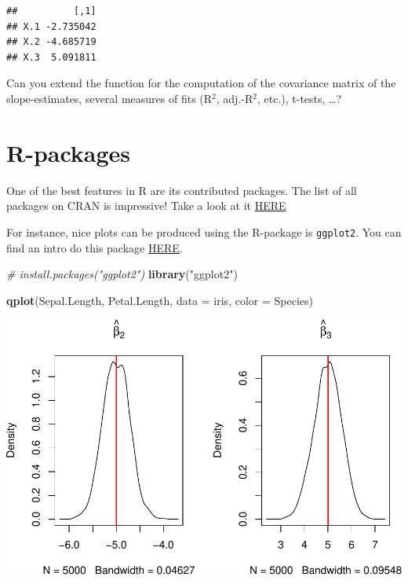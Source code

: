 \documentclass[]{book}
\newenvironment{Shaded}{\begin{snugshade}}{\end{snugshade}}
\newcommand{\CommentTok}[1]{\textcolor[rgb]{0.56,0.35,0.01}{\textit{#1}}}
\newcommand{\DataTypeTok}[1]{\textcolor[rgb]{0.13,0.29,0.53}{#1}}
\newcommand{\KeywordTok}[1]{\textcolor[rgb]{0.13,0.29,0.53}{\textbf{#1}}}
\newcommand{\NormalTok}[1]{#1}
\newcommand{\StringTok}[1]{\textcolor[rgb]{0.31,0.60,0.02}{#1}}
\theoremstyle{definition}
\theoremstyle{definition}
\theoremstyle{definition}
\theoremstyle{remark}
\begin{document}
\begin{verbatim}
##          [,1]
## X.1 -2.735042
## X.2 -4.685719
## X.3  5.091811
\end{verbatim}

Can you extend the function for the computation of the covariance matrix of the slope-estimates, several measures of fits (R\(^2\), adj.-R\(^2\), etc.), t-tests, \ldots{}?

\hypertarget{r-packages}{%
\section{R-packages}\label{r-packages}}

One of the best features in R are its contributed packages. The list of all packages on CRAN is impressive! Take a look at it \href{https://cran.r-project.org/web/packages/available_packages_by_name.html}{HERE}

For instance, nice plots can be produced using the R-package is \texttt{ggplot2}. You can find an intro do this package \href{http://ggplot2.tidyverse.org/}{HERE}.

\begin{Shaded}
\begin{Highlighting}[]
\CommentTok{# install.packages("ggplot2")}
\KeywordTok{library}\NormalTok{(}\StringTok{"ggplot2"}\NormalTok{)}

\KeywordTok{qplot}\NormalTok{(Sepal.Length, Petal.Length, }\DataTypeTok{data =}\NormalTok{ iris, }\DataTypeTok{color =}\NormalTok{ Species)}
\end{Highlighting}
\end{Shaded}

\begin{center}\includegraphics[width=\textwidth]{01-Introduction-to-R_files/figure-latex/unnamed-chunk-32-1} \end{center}
\end{document}
